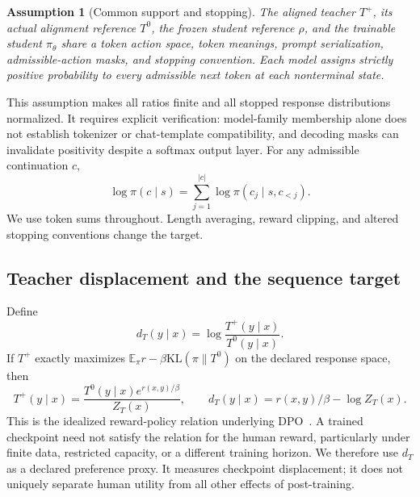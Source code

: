 \documentclass[pdflatex,sn-mathphys-num,review]{sn-jnl}
\theoremstyle{thmstyleone}
\theoremstyle{thmstyletwo}
\theoremstyle{thmstylethree}
\newtheorem{assumption}[theorem]{Assumption}
\providecommand{\Tp}{T^{+}}
\providecommand{\Tz}{T^{0}}
\providecommand{\pth}{\pi_{\theta}}
\providecommand{\E}{\mathbb{E}}
\providecommand{\KL}{\mathrm{KL}}
\begin{document}
\begin{assumption}[Common support and stopping]
\label{ass:support}
The aligned teacher $\Tp$, its actual alignment reference $\Tz$, the frozen student reference $\rho$, and the trainable student $\pth$ share a token action space, token meanings, prompt serialization, admissible-action masks, and stopping convention. Each model assigns strictly positive probability to every admissible next token at each nonterminal state.
\end{assumption}

This assumption makes all ratios finite and all stopped response distributions normalized. It requires explicit verification: model-family membership alone does not establish tokenizer or chat-template compatibility, and decoding masks can invalidate positivity despite a softmax output layer. For any admissible continuation $c$,
\begin{equation}
\log\pi(c\mid s)=\sum_{j=1}^{|c|}\log\pi(c_j\mid s,c_{<j}).
\label{eq:chain}
\end{equation}
We use token sums throughout. Length averaging, reward clipping, and altered stopping conventions change the target.

\subsection{Teacher displacement and the sequence target}
Define
\begin{equation}
d_T(y\mid x)=\log\frac{\Tp(y\mid x)}{\Tz(y\mid x)}.
\label{eq:bg-dT}
\end{equation}
If $\Tp$ exactly maximizes $\E_\pi r-\beta\KL(\pi\|\Tz)$ on the declared response space, then
\begin{equation}
\Tp(y\mid x)=\frac{\Tz(y\mid x)e^{r(x,y)/\beta}}{Z_T(x)},
\qquad d_T(y\mid x)=r(x,y)/\beta-\log Z_T(x).
\label{eq:bg-dpo}
\end{equation}
This is the idealized reward-policy relation underlying DPO~\citep{rafailov2023direct}. A trained checkpoint need not satisfy the relation for the human reward, particularly under finite data, restricted capacity, or a different training horizon. We therefore use $d_T$ as a declared preference proxy. It measures checkpoint displacement; it does not uniquely separate human utility from all other effects of post-training.
\end{document}
